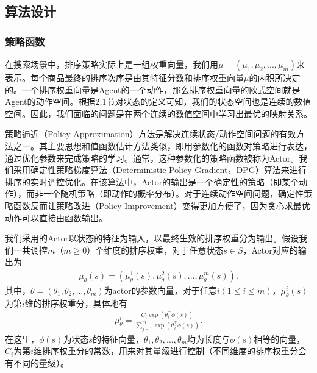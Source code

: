 \subsection{算法设计}

\subsubsection{策略函数}
在搜索场景中，排序策略实际上是一组权重向量，我们用$\mu = (\mu_1, \mu_2, ..., \mu_m)$来表示。每个商品最终的排序次序是由其特征分数和排序权重向量$\mu$的内积所决定的。一个排序权重向量是Agent的一个动作，那么排序权重向量的欧式空间就是Agent的动作空间。根据2.1节对状态的定义可知，我们的状态空间也是连续的数值空间。因此，我们面临的问题是在两个连续的数值空间中学习出最优的映射关系。

策略逼近（Policy Approximation）方法是解决连续状态/动作空间问题的有效方法之一。其主要思想和值函数估计方法类似，即用参数化的函数对策略进行表达，通过优化参数来完成策略的学习。通常，这种参数化的策略函数被称为Actor。我们采用确定性策略梯度算法（Deterministic Policy Gradient，DPG）算法来进行排序的实时调控优化。在该算法中，Actor的输出是一个确定性的策略（即某个动作），而非一个随机策略（即动作的概率分布）。对于连续动作空间问题，确定性策略函数反而让策略改进（Policy Improvement）变得更加方便了，因为贪心求最优动作可以直接由函数输出。

我们采用的Actor以状态的特征为输入，以最终生效的排序权重分为输出。假设我们一共调控$m$（$m \geq 0$）个维度的排序权重，对于任意状态$s \in S$，Actor对应的输出为 \begin{align}
   \mu_{\theta}(s) = (\mu^1_{\theta}(s), \mu^2_{\theta}(s), ..., \mu^m_{\theta}(s) ). 
\end{align}
 其中，$\theta = (\theta_1, \theta_2, …, \theta_m)$为actor的参数向量，对于任意$i (1 ≤ i ≤ m)$，$\mu_{\theta}^i (s)$为第$i$维的排序权重分，具体地有
\begin{align}
 \mu^i_{\theta} = \frac{ C_i \exp(\theta_i^{\top} \phi(s)) }{ \sum_{j=1}^m \exp(\theta_j^{\top} \phi(s)) }. 
\end{align}
 在这里，$\phi(s)$为状态$s$的特征向量，$\theta_1, \theta_2,..., \theta_m$均为长度与$\phi(s)$相等的向量，$C_i$为第$i$维排序权重分的常数，用来对其量级进行控制（不同维度的排序权重分会有不同的量级）。

